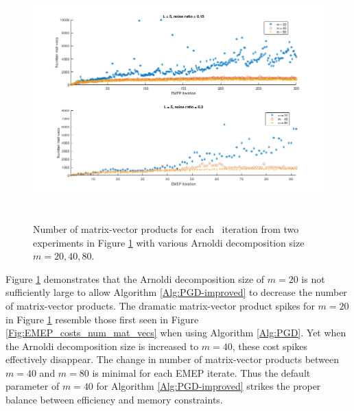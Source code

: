 \begin{figure}[H]
\centering
\hbox{\hspace{-0.9cm} \includegraphics[scale=0.6]{Numerics-num_matvecs_ada_for_m_vals} }\vspace{0.0cm}
	\caption{Number of matrix-vector products for each \emep \ iteration from two experiments in Figure \ref{Fig:Numerics-num_matvecs_ada_for_m_vals} with various Arnoldi decomposition size $m=20, 40, 80$.}
\label{Fig:Numerics-num_matvecs_ada_for_m_vals}
\end{figure}




Figure \ref{Fig:Numerics-num_matvecs_ada_for_m_vals} demonstrates that the Arnoldi decomposition size of $m=20$ is not sufficiently large to allow Algorithm \ref{Alg:PGD-improved} to decrease the number of matrix-vector products.  
The dramatic matrix-vector product spikes for $m=20$ in Figure \ref{Fig:Numerics-num_matvecs_ada_for_m_vals} resemble those first seen in Figure \ref{Fig:EMEP_costs_num_mat_vecs} when using Algorithm \ref{Alg:PGD}.
Yet when the Arnoldi decomposition size is increased to $m=40$, these cost spikes effectively disappear.
The change in number of matrix-vector products between $m=40$ and $m=80$ is minimal for each EMEP iterate.  
Thus the default parameter of $m=40$ for Algorithm \ref{Alg:PGD-improved} strikes the proper balance between efficiency and memory constraints.












